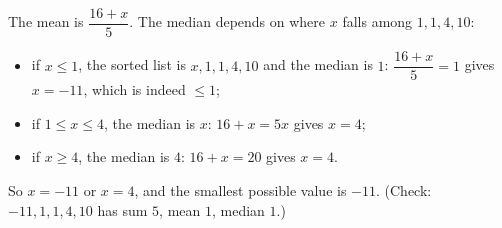 The mean is $\dfrac{16+x}{5}$. The median depends on where $x$ falls among $1,1,4,10$:
\begin{itemize}
\item if $x\le1$, the sorted list is $x,1,1,4,10$ and the median is $1$: $\dfrac{16+x}{5}=1$ gives $x=-11$, which is indeed $\le1$;
\item if $1\le x\le4$, the median is $x$: $16+x=5x$ gives $x=4$;
\item if $x\ge4$, the median is $4$: $16+x=20$ gives $x=4$.
\end{itemize}
So $x=-11$ or $x=4$, and the smallest possible value is $\boxed{-11}$. (Check: $-11,1,1,4,10$ has sum $5$, mean $1$, median $1$.)
